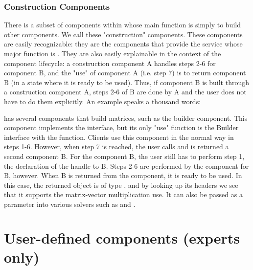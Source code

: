 \subsubsection{Construction Components}

There is a subset of components within \hypre{} whose main function is simply to
build other components. 
We call these "construction" components. These components are easily
recognizable: they are the 
components that provide the  service whose major function is
. They are 
also easily explainable in the context of the component lifecycle:
a construction component A 
handles steps 2-6 for component B, and the "use" of component A (i.e. step 7)
is to return component B (in 
a state where it is ready to be used). Thus, if component B is built through a
construction component A, 
steps 2-6 of B are done by A and the user does not have to do them explicitly.
An example speaks a 
thousand words:

\hypre{} has several components that build matrices, such as the
 builder 
component. This component implements the  interface, but
its only "use" function 
is the Builder interface with the  function. Clients use
this component in the normal 
way in steps 1-6. However, when step 7 is reached, the user calls
 and is returned a 
second component B. For the component B, the user still has to perform step 1,
the declaration of the 
handle to B. Steps 2-6 are performed by the 
component for B, however. 
When B is returned from the component, it is ready to be used. In this case,
the returned object is of type 
, and by looking up its headers we see that it supports the
matrix-vector multiplication 
use. It can also be passed as a parameter into various solvers such as
 and 
.


\section{User-defined components (experts only)}

